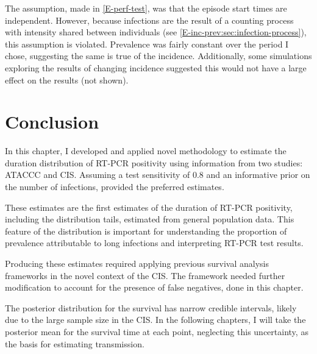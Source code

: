 \documentclass[thesis.tex]{subfiles}
\begin{document}
The assumption, made in \cref{E-perf-test}, was that the episode start times are independent.
However, because infections are the result of a counting process with intensity shared between individuals (see \cref{E-inc-prev:sec:infection-process}), this assumption is violated.
Prevalence was fairly constant over the period I chose, suggesting the same is true of the incidence.
Additionally, some simulations exploring the results of changing incidence suggested this would not have a large effect on the results (not shown).


\section{Conclusion} \label{imperf-test:sec:conclusion}

In this chapter, I developed and applied novel methodology to estimate the duration distribution of RT-PCR positivity using information from two studies: ATACCC and CIS.
Assuming a test sensitivity of 0.8 and an informative prior on the number of infections, provided the preferred estimates.

These estimates are the first estimates of the duration of RT-PCR positivity, including the distribution tails, estimated from general population data.
This feature of the distribution is important for understanding the proportion of prevalence attributable to long infections and interpreting RT-PCR test results.

Producing these estimates required applying previous survival analysis frameworks in the novel context of the CIS.
The framework needed further modification to account for the presence of false negatives, done in this chapter.

The posterior distribution for the survival has narrow credible intervals, likely due to the large sample size in the CIS.
In the following chapters, I will take the posterior mean for the survival time at each point, neglecting this uncertainty, as the basis for estimating transmission.

\ifSubfilesClassLoaded{
  \listoftodos
}{}
\end{document}

